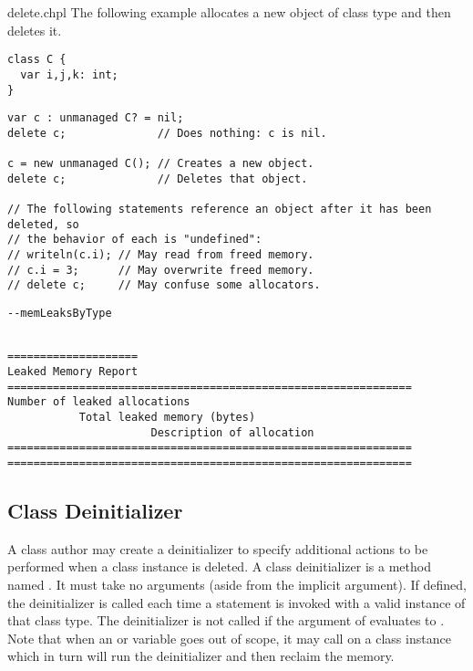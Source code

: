 \begin{chapelexample}{delete.chpl}
The following example allocates a new object  of class type 
and then deletes it.
\begin{chapelpre}
\begin{verbatim}
class C {
  var i,j,k: int;
}
\end{verbatim}
\end{chapelpre}
\begin{chapel}
\begin{verbatim}
var c : unmanaged C? = nil;
delete c;              // Does nothing: c is nil.

c = new unmanaged C(); // Creates a new object.
delete c;              // Deletes that object.

// The following statements reference an object after it has been deleted, so
// the behavior of each is "undefined":
// writeln(c.i); // May read from freed memory.
// c.i = 3;      // May overwrite freed memory.
// delete c;     // May confuse some allocators.
\end{verbatim}
\end{chapel}
\begin{chapelexecopts}
\begin{verbatim}
--memLeaksByType
\end{verbatim}
\end{chapelexecopts}
\begin{chapeloutput}
\begin{verbatim}

====================
Leaked Memory Report
==============================================================
Number of leaked allocations
           Total leaked memory (bytes)
                      Description of allocation
==============================================================
==============================================================
\end{verbatim}
\end{chapeloutput}
\end{chapelexample}

\subsection{Class Deinitializer}
\label{Class_Deinitializer}

A class author may create a deinitializer to specify additional actions
to be performed when a class instance is deleted.
A class deinitializer is a method named .  It must take no
arguments (aside from the implicit  argument).  If defined,
the deinitializer is called each time a  statement is
invoked with a valid instance of that class type. The deinitializer is
not called if the argument of  evaluates to .
Note that when an  or  variable goes out of
scope, it may call  on a class instance which in turn will
run the deinitializer and then reclaim the memory.

